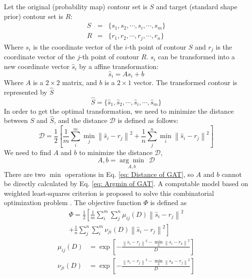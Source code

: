 Let the original (probability map) contour set is $S$ and target (standard shape prior) contour set is $R$:
\begin{eqnarray*}
  S &=& \{s_1, s_2, \cdots, s_i, \cdots, s_m \} \\
  R &=& \{r_1, r_2, \cdots, r_j, \cdots, r_n\}
\end{eqnarray*}
Where $s_i$ is the coordinate vector of the $i$-th point of contour $S$ and $r_j$ is the coordinate vector of the $j$-th point of contour $R$. $s_i$ can be transformed into a new coordinate vector $\hat{s}_i$ by a affine transformation:
\begin{equation}
    \hat{s}_i = A s_i + b
\end{equation}
Where $A$ is a $2\times 2$ matrix, and $b$ is a $2\times 1$ vector. The transformed contour is represented by $\hat{S}$
\begin{equation*}
    \hat{S} = \{\hat{s}_1, \hat{s}_2, \cdots, \hat{s}_i, \cdots, \hat{s}_m\}
\end{equation*}
In order to get the optimal transformation, we need to minimize the distance between $S$ and $\hat{S}$, and the distance $\mathcal{D}$ is defined as follows:
\begin{equation}\label{eq: Distance of GAT}
\mathcal{D} = \frac{1}{2}\left[ \frac{1}{m}\sum_i^m \underset{j}{\min}\left\|\hat{s}_i - r_j\right\|^2 + \frac{1}{n}\sum_j^n \underset{i}{\min}\left\|\hat{s}_i-r_j\right\|^2 \right]
\end{equation}
We need to find $A$ and $b$ to minimize the distance $\mathcal{D}$,
\begin{equation}\label{eq: Argmin of GAT}
    A,b = \underset{A,b}{\arg\min} \ \ \mathcal{D}
\end{equation}
There are two $\min$ operations in Eq. \ref{eq: Distance of GAT}, so $A$ and $b$ cannot be directly calculated by Eq. \ref{eq: Argmin of GAT}. A computable model based on weighted least-squares criterion is proposed to solve this combinatorial optimization problem \cite{GAT:wakahara1998adaptive}. The objective function $\Phi$ is defined as
\begin{multline}\label{eq: new objective funtion of GAT}
    \Phi = \frac{1}{2}\left[ \frac{1}{m}\sum_i^m\sum_j^n \mu_{ij}(D)\left\|\hat{s}_i-r_j\right\|^2 \right. \\
    \left. + \frac{1}{n}\sum_j^n\sum_i^m \nu_{ji}(D)\left\|\hat{s}_i-r_j\right\|^2 \right]
\end{multline}
\begin{align*}
  \mu_{ij}(D) &= \exp\left[-\frac{\left\|s_i-r_j\right\|^2 - \underset{k}{\min}\left\| s_i-r_k \right\|^2}{D} \right] \\
  \nu_{ji}(D) &= \exp\left[-\frac{\left\|s_i-r_j\right\|^2 - \underset{k}{\min}\left\| s_k-r_j \right\|^2}{D} \right]
\end{align*}
